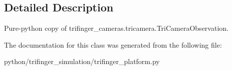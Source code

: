 \subsection{Detailed Description}
Pure-\/python copy of trifinger\+\_\+cameras.\+tricamera.\+Tri\+Camera\+Observation. 



The documentation for this class was generated from the following file\+:\begin{DoxyCompactItemize}
\item 
python/trifinger\+\_\+simulation/trifinger\+\_\+platform.\+py\end{DoxyCompactItemize}
